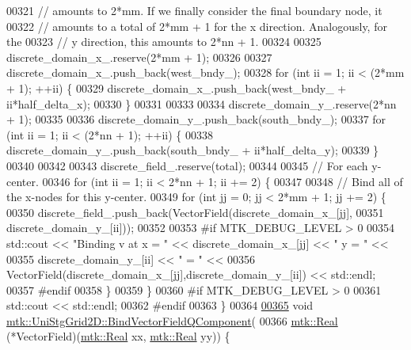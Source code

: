 \begin{DoxyCode}
00321   \textcolor{comment}{// amounts to 2*mm. If we finally consider the final boundary node, it}
00322   \textcolor{comment}{// amounts to a total of 2*mm + 1 for the x direction. Analogously, for the}
00323   \textcolor{comment}{// y direction, this amounts to 2*nn + 1.}
00324 
00325   discrete\_domain\_x\_.reserve(2*mm + 1);
00326 
00327   discrete\_domain\_x\_.push\_back(west\_bndy\_);
00328   \textcolor{keywordflow}{for} (\textcolor{keywordtype}{int} ii = 1; ii < (2*mm + 1); ++ii) \{
00329     discrete\_domain\_x\_.push\_back(west\_bndy\_ + ii*half\_delta\_x);
00330   \}
00331 
00333 
00334   discrete\_domain\_y\_.reserve(2*nn + 1);
00335 
00336   discrete\_domain\_y\_.push\_back(south\_bndy\_);
00337   \textcolor{keywordflow}{for} (\textcolor{keywordtype}{int} ii = 1; ii < (2*nn + 1); ++ii) \{
00338     discrete\_domain\_y\_.push\_back(south\_bndy\_ + ii*half\_delta\_y);
00339   \}
00340 
00342 
00343   discrete\_field\_.reserve(total);
00344 
00345   \textcolor{comment}{// For each y-center.}
00346   \textcolor{keywordflow}{for} (\textcolor{keywordtype}{int} ii = 1; ii < 2*nn + 1; ii += 2) \{
00347 
00348     \textcolor{comment}{// Bind all of the x-nodes for this y-center.}
00349     \textcolor{keywordflow}{for} (\textcolor{keywordtype}{int} jj = 0; jj < 2*mm + 1; jj += 2) \{
00350       discrete\_field\_.push\_back(VectorField(discrete\_domain\_x\_[jj],
00351                                             discrete\_domain\_y\_[ii]));
00352 
00353 \textcolor{preprocessor}{      #if MTK\_DEBUG\_LEVEL > 0}
00354       std::cout << \textcolor{stringliteral}{"Binding v at x = "} << discrete\_domain\_x\_[jj] << \textcolor{stringliteral}{" y = "} <<
00355         discrete\_domain\_y\_[ii] << \textcolor{stringliteral}{" = "} <<
00356         VectorField(discrete\_domain\_x\_[jj],discrete\_domain\_y\_[ii]) << std::endl;
00357 \textcolor{preprocessor}{      #endif}
00358     \}
00359   \}
00360 \textcolor{preprocessor}{  #if MTK\_DEBUG\_LEVEL > 0}
00361   std::cout << std::endl;
00362 \textcolor{preprocessor}{  #endif}
00363 \}
00364 
\hypertarget{mtk__uni__stg__grid__2d_8cc_source_l00365}{}\hyperlink{classmtk_1_1UniStgGrid2D_a8b7ae23231a4a694073b6c22715a4375}{00365} \textcolor{keywordtype}{void} \hyperlink{classmtk_1_1UniStgGrid2D_a8b7ae23231a4a694073b6c22715a4375}{mtk::UniStgGrid2D::BindVectorFieldQComponent}(
00366   \hyperlink{group__c01-roots_gac080bbbf5cbb5502c9f00405f894857d}{mtk::Real} (*VectorField)(\hyperlink{group__c01-roots_gac080bbbf5cbb5502c9f00405f894857d}{mtk::Real} xx, \hyperlink{group__c01-roots_gac080bbbf5cbb5502c9f00405f894857d}{mtk::Real} yy)) \{

\end{DoxyCode}
